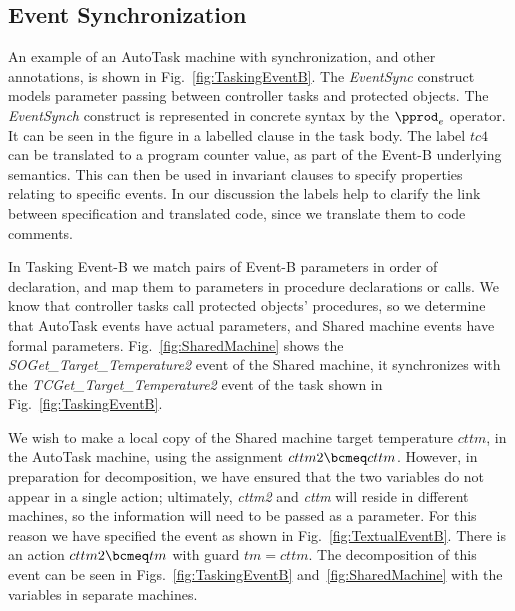 \subsection{Event Synchronization}
An example of an AutoTask machine with synchronization, and other annotations, is shown in Fig.~\ref{fig:TaskingEventB}.
%
The \emph{EventSync} construct models parameter passing between controller tasks and protected objects. The \emph{EventSynch} construct is represented in concrete syntax by the $\pprod_e$ operator. It can be seen in the figure in a labelled clause in the task body. The label $tc4$ can be translated to a program counter value, as part of the Event-B underlying semantics. This can then be used in invariant clauses to specify properties relating to specific events. In our discussion the labels help to clarify the link between specification and translated code, since we translate them to code comments.

 In Tasking Event-B we match pairs of Event-B parameters in order of declaration, and map them to parameters in procedure declarations or calls. We know that controller tasks call protected objects' procedures, so we determine that  AutoTask events have actual parameters, and Shared machine events have formal parameters. Fig.~\ref{fig:SharedMachine} shows the \emph{SOGet\_Target\_Temperature2} event of the Shared machine, it synchronizes with the \emph{TCGet\_Target\_Temperature2} event of the task shown in Fig.~\ref{fig:TaskingEventB}. 
%

We wish to make a local copy of the Shared machine target temperature $cttm$, in the AutoTask machine,  using the assignment $cttm2 \bcmeq cttm$. However, in preparation for decomposition, we have ensured that the two variables do not appear in a single action; ultimately, \emph{cttm2} and \emph{cttm} will reside in different machines, so the information will need to be passed as a parameter. For this reason we have specified the event as shown in Fig.~\ref{fig:TextualEventB}. There is an action $cttm2 \bcmeq tm$ with guard $tm = cttm$. The decomposition of this event can be seen in Figs.~\ref{fig:TaskingEventB} and~\ref{fig:SharedMachine} with the variables in separate machines.

